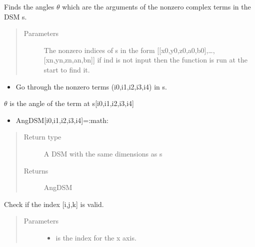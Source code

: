\documentclass[letterpaper,10pt,english]{sphinxmanual}
\begin{document}
\begin{fulllineitems}
\begin{fulllineitems}
\label{\detokenize{index:DictionarySparseMatrix.DS.sparse_angles}}
Finds the angles \(\theta\) which are the arguments     of the nonzero complex terms in the DSM s.
\begin{quote}\begin{description}
\item[{Parameters}] \leavevmode
{} \textendash{} The non\sphinxhyphen{}zero indices of s in the form {[}{[}x0,y0,z0,a0,b0{]},…,{[}xn,yn,zn,an,bn{]}{]}     if ind is not input then the function {\hyperref[\detokenize{index:DictionarySparseMatrix.DS.nonzero}]{}} is run at the start to find it.

\end{description}\end{quote}
\begin{itemize}
\item {} 
Go through the nonzero terms (i0,i1,i2,i3,i4) in s.

\end{itemize}

\(\theta\)  is the angle of the term at s{[}i0,i1,i2,i3,i4{]}
\begin{itemize}
\item {} 
AngDSM{[}i0,i1,i2,i3,i4{]}=:math:

\end{itemize}
\begin{quote}\begin{description}
\item[{Return type}] \leavevmode
A DSM with the same dimensions as s

\item[{Returns}] \leavevmode
AngDSM

\end{description}\end{quote}

\end{fulllineitems}


\begin{fulllineitems}
\label{\detokenize{index:DictionarySparseMatrix.DS.stopcheck}}
Check if the index {[}i,j,k{]} is valid.
\begin{quote}\begin{description}
\item[{Parameters}] \leavevmode\begin{itemize}
\item {} 
 \textendash{} is the index for the x axis.


\end{itemize}
\end{description}
\end{quote}
\end{fulllineitems}
\end{fulllineitems}
\end{document}
